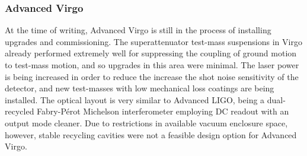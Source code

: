 \subsubsection{Advanced Virgo}
At the time of writing, Advanced Virgo is still in the process of installing upgrades and commissioning. 
The superattenuator test-mass suspensions in Virgo already performed extremely well for suppressing the coupling of ground motion to test-mass motion, and so upgrades in this area were minimal.
The laser power is being increased in order to reduce the increase the shot noise sensitivity of the detector, and new test-masses with low mechanical loss coatings are being installed.
The optical layout is very similar to Advanced LIGO, being a dual-recycled Fabry-P\'{e}rot Michelson interferometer employing DC readout with an output mode cleaner.
Due to restrictions in available vacuum enclosure space, however, stable recycling cavities were not a feasible design option for Advanced Virgo. 


